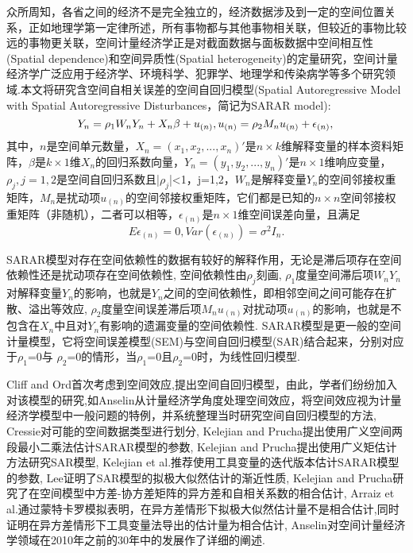 \documentclass[a4paper,c5size,onecolumn,twoside,cap,Chinese]{APSart}
\begin{document}
众所周知，各省之间的经济不是完全独立的，经济数据涉及到一定的空间位置关系，正如地理学第一定律所述，所有事物都与其他事物相关联，但较近的事物比较远的事物更关联，空间计量经济学正是对截面数据与面板数据中空间相互性(Spatial dependence)和空间异质性(Spatial heterogeneity)的定量研究，空间计量经济学广泛应用于经济学、环境科学、犯罪学、地理学和传染病学等多个研究领域.本文将研究含空间自相关误差的空间自回归模型(Spatial Autoregressive Model with Spatial Autoregressive Disturbances，简记为SARAR model):
\begin{equation}
    Y_{n} =\rho_1W_nY_n+X_n\beta+u_{(n)}, u_{(n)}=\rho_2M_nu_{(n)}+\epsilon_{(n)} ,\label{model}\\
\end{equation}
其中，$n$是空间单元数量，$X_n=(x_1,x_2,...,x_n )'$是$n ×k$维解释变量的样本资料矩阵，$\beta$是$k×1$维$X_n$的回归系数向量，$Y_n=(y_1,y_2,...,y_n )'$是$n ×1$维响应变量，$\rho_j,j=1,2$是空间自回归系数且|$\rho_j$|<1，j=1,2，$W_n$是解释变量$Y_n$的空间邻接权重矩阵，$M_n$是扰动项$u_{(n)}$的空间邻接权重矩阵，它们都是已知的$n ×n$空间邻接权重矩阵（非随机），二者可以相等，$\epsilon_{(n)}$是$n ×1$维空间误差向量，且满足
$$
E\epsilon_{(n)}=0,Var(\epsilon_{(n)})=\sigma^2 I_n.
$$

SARAR模型对存在空间依赖性的数据有较好的解释作用，无论是滞后项存在空间依赖性还是扰动项存在空间依赖性, 空间依赖性由$\rho_j$刻画, $\rho_1$度量空间滞后项$W_nY_n$对解释变量$Y_n$的影响，也就是$Y_n$之间的空间依赖性，即相邻空间之间可能存在扩散、溢出等效应, $\rho_2$度量空间误差滞后项$M_nu_{(n)}$对扰动项$u_{(n)}$的影响，也就是不包含在$X_n$中且对$Y_n$有影响的遗漏变量的空间依赖性. SARAR模型是更一般的空间计量模型，它将空间误差模型(SEM)与空间自回归模型(SAR)结合起来，分别对应于$\rho_1$=0与 $\rho_2$=0的情形，当$\rho_1$=0且$\rho_2$=0时，为线性回归模型.

Cliff and Ord首次考虑到空间效应,提出空间自回归模型，由此，学者们纷纷加入对该模型的研究,如Anselin从计量经济学角度处理空间效应，将空间效应视为计量经济学模型中一般问题的特例，并系统整理当时研究空间自回归模型的方法, Cressie对可能的空间数据类型进行划分,  Kelejian and Prucha提出使用广义空间两段最小二乘法估计SARAR模型的参数, Kelejian and Prucha提出使用广义矩估计方法研究SAR模型, Kelejian et al.推荐使用工具变量的迭代版本估计SARAR模型的参数, Lee证明了SAR模型的拟极大似然估计的渐近性质, Kelejian and Prucha研究了在空间模型中方差-协方差矩阵的异方差和自相关系数的相合估计, Arraiz et al.通过蒙特卡罗模拟表明，在异方差情形下拟极大似然估计量不是相合估计,同时证明在异方差情形下工具变量法导出的估计量为相合估计, Anselin对空间计量经济学领域在2010年之前的30年中的发展作了详细的阐述.
\end{document}
